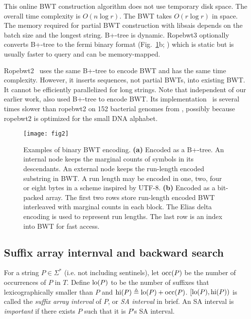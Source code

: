 \documentclass[webpdf,contemporary,large,namedate]{oup-authoring-template}%
\begin{document}
This online BWT construction algorithm does not use temporary disk space.
The overall time complexity is $O(n\log r)$.
The BWT takes $O(r\log r)$ in space.
The memory required for partial BWT construction with libsais depends on the batch size and the longest string.
B+-tree is dynamic.
Ropebwt3 optionally converts B+-tree to the fermi binary format (Fig.~\ref{fig:2}b; \citealt*{Li:2012fk})
which is static but is usually faster to query and can be memory-mapped.

Ropebwt2~\citep{Li:2014ab} uses the same B+-tree to encode BWT and has the same time complexity.
However, it inserts sequences, not partial BWTs, into existing BWT.
It cannot be efficiently parallelized for long strings.
Note that independent of our earlier work, \citet{DBLP:journals/jda/OhnoSTIS18} also used B+-tree to encode BWT.
Its implementation~\citep{DBLP:journals/tcs/BannaiGI20} is several times slower than ropebwt2 on 152 bacterial genomes from \citet{Li:2024ab},
possibly because ropebwt2 is optimized for the small DNA alphabet.

\begin{figure}[bt]
\centering
\texttt{[image: fig2]}
\caption{Examples of binary BWT encoding.
{\bf (a)} Encoded as a B+-tree.
An internal node keeps the marginal counts of symbols in its descendants.
An external node keeps the run-length encoded substring in BWT.
A run length may be encoded in one, two, four or eight bytes in a scheme inspired by UTF-8.
{\bf (b)} Encoded as a bit-packed array.
The first two rows store run-length encoded BWT interleaved with marginal counts in each block.
The Elias delta encoding is used to represent run lengths.
The last row is an index into BWT for fast access.
}\label{fig:2}
\end{figure}

\subsection{Suffix array internval and backward search}

For a string $P\in\Sigma^*$ (i.e. not including sentinels), let ${\rm occ}(P)$ be the number of occurrences of $P$ in $T$.
Define ${\rm lo}(P)$ to be the number of suffixes that lexicographically smaller than $P$
and ${\rm hi}(P)\triangleq {\rm lo}(P)+{\rm occ}(P)$.
$[{\rm lo}(P),{\rm hi}(P))$ is called the \emph{suffix array interval} of $P$, or \emph{SA interval} in brief.
An SA interval is \emph{important} if there exists $P$ such that it is $P$'s SA interval.
\end{document}

